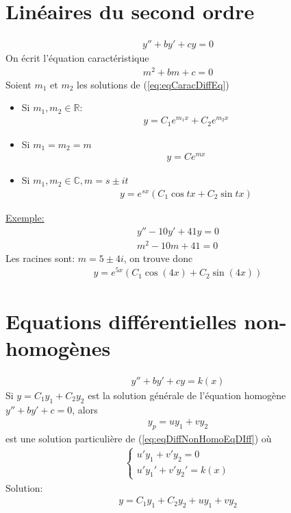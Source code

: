 \section{Linéaires du second ordre}
\begin{eqnarray}
	y''+by'+cy=0
\end{eqnarray}
On écrit l'équation caractéristique
\begin{eqnarray}
	\label{eq:eqCaracDiffEq}
	m^2+bm+c=0
\end{eqnarray}
Soient $m_1$ et $m_2$ les solutions de (\ref{eq:eqCaracDiffEq})
\begin{itemize}
	\item Si $m_1, m_2\in\mathbb R$: 
	\begin{eqnarray}
		y=C_1e^{m_1x}+C_2e^{m_2x}
	\end{eqnarray}
	\item Si $m_1=m_2=m$
	\begin{eqnarray}
		y=Ce^{mx}
	\end{eqnarray}
	\item Si $m_1, m_2\in\mathbb C, m=s\pm it$
	\begin{eqnarray}
		y=e^{sx}\left(C_1\cos{tx}+C_2\sin{tx}\right)
	\end{eqnarray}
\end{itemize}

\underline{Exemple:}
\begin{eqnarray*}
	y''-10y'+41y=0
	\\
	m^2-10m+41=0
\end{eqnarray*}
Les racines sont: $m=5\pm4i$, on trouve donc
\begin{eqnarray*}
	y=e^{5x}\left(C_1\cos{(4x)}+C_2\sin{(4x)}\right)
\end{eqnarray*}
\section{Equations différentielles non-homogènes}
\begin{eqnarray}
	\label{eq:eqDiffNonHomoEqDIff}
	y''+by'+cy=k(x)
\end{eqnarray}
Si $y=C_1y_1+C_2y_2$ est la solution générale de l'équation homogène $y''+by'+c=0$, alors
\begin{eqnarray}
	y_p=uy_1+vy_2
\end{eqnarray}
est une solution particulière de (\ref{eq:eqDiffNonHomoEqDIff}) où
\begin{eqnarray}
	\begin{cases}
		u'y_1+v'y_2=0\\
		u'y_1'+v'y_2'=k(x)
	\end{cases}
\end{eqnarray}
Solution:
\begin{eqnarray}
	y=C_1y_1+C_2y_2+uy_1+vy_2
\end{eqnarray}

